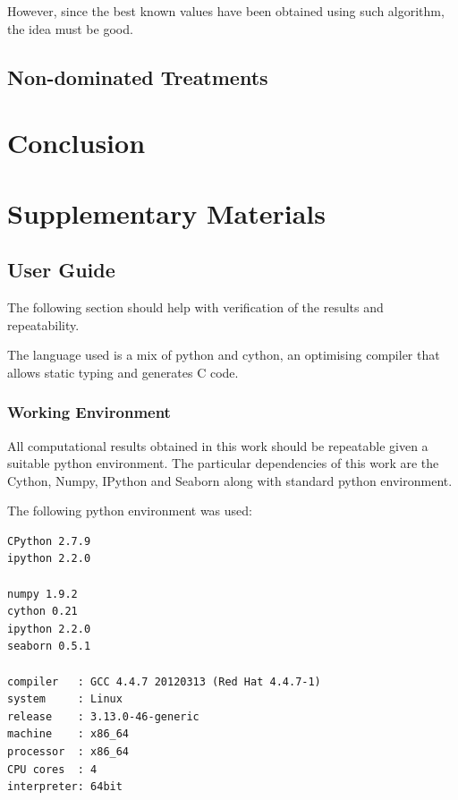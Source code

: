 \documentclass{article} %
\begin{document}
However, since the best known values have been obtained using such algorithm, the idea must be good.


\subsection{Non-dominated Treatments}



\section{Conclusion}











\newpage
\section{Supplementary Materials}

\subsection{User Guide}
\label{user_guide}

The following section should help with verification of the results and repeatability.\newline

The language used is a mix of python and cython, an optimising compiler that allows static typing and generates C code.


\subsubsection{Working Environment}
All computational results obtained in this work should be repeatable given a suitable python environment. The particular dependencies of this work are the Cython, Numpy, IPython and Seaborn along with standard python environment.\newline

The following python environment was used:

\begin{verbatim}
CPython 2.7.9
ipython 2.2.0

numpy 1.9.2
cython 0.21
ipython 2.2.0
seaborn 0.5.1

compiler   : GCC 4.4.7 20120313 (Red Hat 4.4.7-1)
system     : Linux
release    : 3.13.0-46-generic
machine    : x86_64
processor  : x86_64
CPU cores  : 4
interpreter: 64bit

\end{verbatim}
\end{document}
